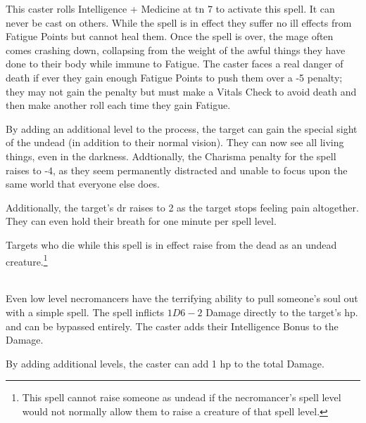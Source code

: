 \begin{multicols}{2}
This caster rolls Intelligence + Medicine at \gls{tn} 7 to activate this spell. It can never be cast on others. While the spell is in effect they suffer no ill effects from Fatigue Points but cannot heal them. Once the spell is over, the mage often comes crashing down, collapsing from the weight of the awful things they have done to their body while immune to Fatigue. The caster faces a real danger of death if ever they gain enough Fatigue Points to push them over a -5 penalty; they may not gain the penalty but must make a Vitals Check to avoid death and then make another roll each time they gain Fatigue.


By adding an additional level to the process, the target can gain the special sight of the undead (in addition to their normal vision).
They can now see all living things, even in the darkness.
Addtionally, the Charisma penalty for the spell raises to -4, as they seem permanently distracted and unable to focus upon the same world that everyone else does.

Additionally, the target's \gls{dr} raises to 2 as the target stops feeling pain altogether.  They can even hold their breath for one minute per spell level.

Targets who die while this spell is in effect raise from the dead as an undead creature.\footnote{This spell cannot raise someone as undead if the necromancer's spell level would not normally allow them to raise a creature of that spell level.}

\spelllevel

\\
Even low level necromancers have the terrifying ability to pull someone's soul out with a simple spell.  The spell inflicts $1D6-2$ Damage directly to the target's \gls{hp}.   and  can be bypassed entirely.  The caster adds their Intelligence Bonus to the Damage.


By adding additional levels, the caster can add 1 \gls{hp} to the total Damage.

\end{multicols}


